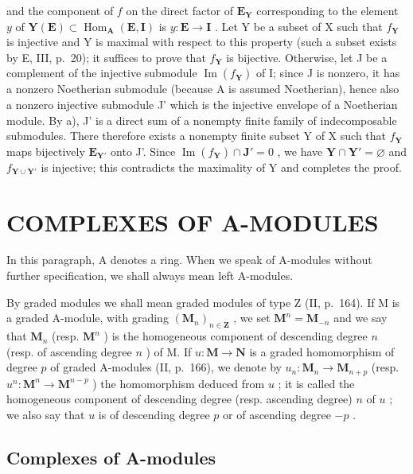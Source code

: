 and the component of \(f\) on the direct factor of \(\mathbf{E}_{\mathbf{Y}}\) corresponding to the element \(y\) of \(\mathbf{Y}(\mathbf{E}) \subset \operatorname{Hom}_{\mathbf{A}}(\mathbf{E}, \mathbf{I})\) is \(y: \mathbf{E} \to \mathbf{I}\) . Let Y be a subset of X such that \(f_{\mathbf{Y}}\) is injective and Y is maximal with respect to this property (such a subset exists by E, III, p.~20); it suffices to prove that \(f_{\mathbf{Y}}\) is bijective. Otherwise, let J be a complement of the injective submodule \(\operatorname{Im}(f_{\mathbf{Y}})\) of I; since J is nonzero, it has a nonzero Noetherian submodule (because A is assumed Noetherian), hence also a nonzero injective submodule J' which is the injective envelope of a Noetherian module. By a), J' is a direct sum of a nonempty finite family of indecomposable submodules. There therefore exists a nonempty finite subset Y of X such that \(f_{\mathbf{Y}}\) maps bijectively \(\mathbf{E}_{\mathbf{Y}'}\) onto J'. Since \(\operatorname{Im}(f_{\mathbf{Y}}) \cap \mathbf{J}' = 0\) , we have \(\mathbf{Y} \cap \mathbf{Y}' = \varnothing\) and \(f_{\mathbf{Y} \cup \mathbf{Y}'}\) is injective; this contradicts the maximality of Y and completes the proof.

\section{COMPLEXES OF A-MODULES}

In this paragraph, A denotes a ring. When we speak of A-modules without further specification, we shall always mean left A-modules.

By graded modules we shall mean graded modules of type Z (II, p.~164). If M is a graded A-module, with grading \((\mathbf{M}_n)_{n \in \mathbf{Z}}\) , we set \(\mathbf{M}^n = \mathbf{M}_{-n}\) and we say that \(\mathbf{M}_n\) (resp. \(\mathbf{M}^n\) ) is the homogeneous component of descending degree \(n\) (resp. of ascending degree \(n\) ) of M. If \(u: \mathbf{M} \to \mathbf{N}\) is a graded homomorphism of degree \(p\) of graded A-modules (II, p.~166), we denote by \(u_n: \mathbf{M}_n \to \mathbf{M}_{n+p}\) (resp. \(u^n: \mathbf{M}^n \to \mathbf{M}^{n-p}\) ) the homomorphism deduced from \(u\) ; it is called the homogeneous component of descending degree (resp. ascending degree) \(n\) of \(u\) ; we also say that \(u\) is of descending degree \(p\) or of ascending degree \(-p\) .

\subsection{Complexes of A-modules}

